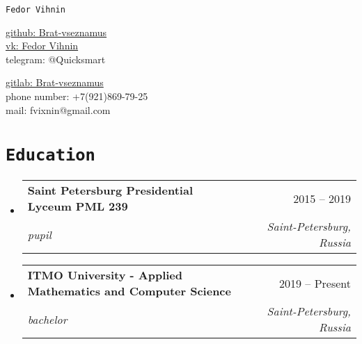 \documentclass[letterpaper,10pt]{article}
\makeatletter
\newcommand{\apricotColor}[1]{\colorbox{Apricot}{\texttt{#1}}}
\newcommand{\resumeSubheading}[4]{
  \vspace{-2pt}\item
    \begin{tabular*}{0.97\textwidth}[t]{l@{\extracolsep{\fill}}r}
      \textbf{#1} & #2 \\
      \textit{\small#3} & \textit{\small #4} \\
    \end{tabular*}\vspace{-7pt}
}
\newcommand{\resumeSubHeadingListStart}{\begin{itemize}[leftmargin=0.15in, label={}]}
\newcommand{\resumeSubHeadingListEnd}{\end{itemize}}
\makeatother
\begin{document}
\begin{center}
  \colorbox{Peach}{\texttt{{\LARGE Fedor Vihnin}}} \\ \vspace{2pt}
    \begin{multicols}{2}
    \begin{flushleft}
    \href{https://github.com/Brat-vseznamus}{github: Brat-vseznamus}\\
    \href{https://vk.com/looongboooi}{vk: Fedor Vihnin}\\
    telegram: @Quicksmart
    \end{flushleft}
    
    \begin{flushright}
    \href{https://gitlab.com/Brat-vseznamus}{gitlab: Brat-vseznamus}\\
    phone number: +7(921)869-79-25\\
    mail: fvixnin@gmail.com
    \end{flushright}
    \end{multicols}
\end{center}


\vspace{-2pt}
\section{\apricotColor{Education}}
    \resumeSubHeadingListStart
        \resumeSubheading
        {Saint Petersburg Presidential Lyceum PML 239
        }{2015 -- 2019}
        {pupil}{Saint-Petersburg, Russia}

    \resumeSubHeadingListEnd
  \resumeSubHeadingListStart
      \resumeSubheading
      {ITMO University - Applied Mathematics and Computer Science}{2019 -- Present}
      {bachelor}{Saint-Petersburg, Russia}

  \resumeSubHeadingListEnd


\end{document}
